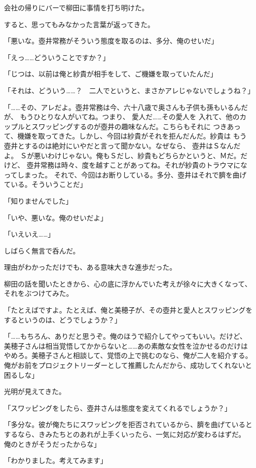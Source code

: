 ﻿\documentclass[
    book,tate,
    line_length=30zw,
    jafontsize=12pt,
    paper=b5j,
    landscape,
    ]{jlreq}
\begin{document}
会社の帰りにバーで柳田に事情を打ち明けた。

すると、思ってもみなかった言葉が返ってきた。

「悪いな。壺井常務がそういう態度を取るのは、多分、俺のせいだ」

「えっ……どういうことですか？」

「じつは、以前は俺と紗貴が相手をして、ご機嫌を取っていたんだ」

「それは、どういう……？　二人でというと、まさかアレじゃないでしょうね？」

「……その、アレだよ。壺井常務は今、六十八歳で奥さんも子供も孫もいるんだが、
もうひとりな人がいてね。つまり、 愛人だ……その愛人を
入れて、他のカップルとスワッピングするのが壺井の趣味なんだ。こちらもそれに
つきあって、機嫌を取ってきた。しかし、今回は紗貴がそれを拒んだんだ。紗貴は
もう壺井とするのは絶対にいやだと言って聞かない。なぜなら、 壺井はＳなんだよ。
Ｓが悪いわけじゃない。俺もＳだし、紗貴もどちらかというと、Ｍだ。だけど、
壺井常務は時々、度を越すことがあってね。それが紗貴のトラウマになってしまった。
それで、今回はお断りしている。多分、壺井はそれで臍を曲げている。そういうことだ」

「知りませんでした」

「いや、悪いな。俺のせいだよ」

「いえいえ……」

しばらく無言で呑んだ。

理由がわかっただけでも、ある意味大きな進歩だった。

柳田の話を聞いたときから、心の底に浮かんでいた考えが徐々に大きくなって、
それをぶつけてみた。

「たとえばですよ。たとえば、俺と美穂子が、その壺井と愛人とスワッピングを
するというのは、どうでしょうか？」

「……もちろん、ありだと思うぞ。俺のほうで紹介してやってもいい。だけど、
美穂子さんは相当覚悟してかからないと……あの素敵な女性を泣かせるのだけは
やめろ。美穂子さんと相談して、覚悟の上で挑むのなら、俺が二人を紹介する。
俺がお前をプロジェクトリーダーとして推薦したんだから、成功してくれないと
困るしな」

光明が見えてきた。

「スワッピングをしたら、壺井さんは態度を変えてくれるでしょうか？」

「多分な。彼が俺たちにスワッピングを拒否されているから、臍を曲げていると
するなら、きみたちとのあれが上手くいったら、一気に対応が変わるはずだ。
俺のときがそうだったからな」

「わかりました。考えてみます」
\end{document}
